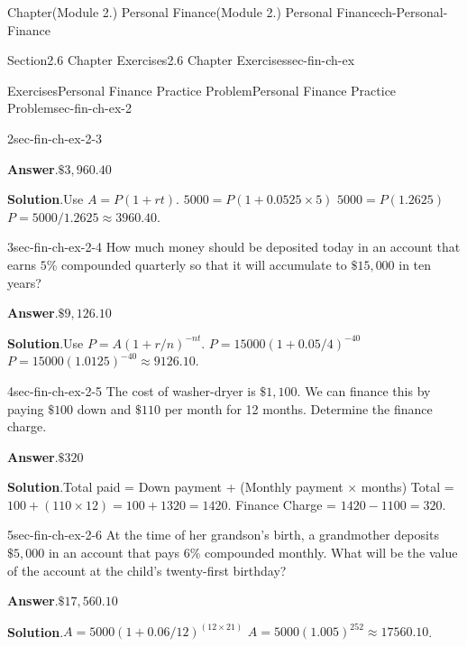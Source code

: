 \documentclass[oneside,10pt,]{book}
\newcommand{\blocktitlefont}{\relax}
\begin{document}
\begin{chapterptx}{Chapter}{(Module 2.) Personal Finance}{}{(Module 2.) Personal Finance}{}{}{ch-Personal-Finance}
\begin{sectionptx}{Section}{2.6 Chapter Exercises}{}{2.6 Chapter Exercises}{}{}{sec-fin-ch-ex}
\begin{exercises-subsection-numberless}{Exercises}{Personal Finance Practice Problem}{}{Personal Finance Practice Problem}{}{}{sec-fin-ch-ex-2}
\begin{divisionexercise}{2}{}{}{sec-fin-ch-ex-2-3}
\par\smallskip%
\noindent\textbf{\blocktitlefont Answer}.\hypertarget{sec-fin-ch-ex-2-3-2}{}\quad{}\(\$3,960.40\)%
\par\smallskip%
\noindent\textbf{\blocktitlefont Solution}.\hypertarget{sec-fin-ch-ex-2-3-3}{}\quad{}Use \(A = P(1 + rt)\). \(5000 = P(1 + 0.0525 \times 5)\) \(5000 = P(1.2625)\) \(P = 5000 / 1.2625 \approx 3960.40\).%
\end{divisionexercise}%
\begin{divisionexercise}{3}{}{}{sec-fin-ch-ex-2-4}%
How much money should be deposited today in an account that earns \(5\%\) compounded quarterly so that it will accumulate to \(\$15,000\) in ten years?%
\par\smallskip%
\noindent\textbf{\blocktitlefont Answer}.\hypertarget{sec-fin-ch-ex-2-4-2}{}\quad{}\(\$9,126.10\)%
\par\smallskip%
\noindent\textbf{\blocktitlefont Solution}.\hypertarget{sec-fin-ch-ex-2-4-3}{}\quad{}Use \(P = A(1 + r/n)^{-nt}\). \(P = 15000(1 + 0.05/4)^{-40}\) \(P = 15000(1.0125)^{-40} \approx 9126.10\).%
\end{divisionexercise}%
\begin{divisionexercise}{4}{}{}{sec-fin-ch-ex-2-5}%
The cost of washer-dryer is \(\$1,100\). We can finance this by paying \(\$100\) down and \(\$110\) per month for 12 months. Determine the finance charge.%
\par\smallskip%
\noindent\textbf{\blocktitlefont Answer}.\hypertarget{sec-fin-ch-ex-2-5-2}{}\quad{}\(\$320\)%
\par\smallskip%
\noindent\textbf{\blocktitlefont Solution}.\hypertarget{sec-fin-ch-ex-2-5-3}{}\quad{}Total paid = Down payment + (Monthly payment \(\times\) months) Total = \(100 + (110 \times 12) = 100 + 1320 = 1420\). Finance Charge = \(1420 - 1100 = 320\).%
\end{divisionexercise}%
\begin{divisionexercise}{5}{}{}{sec-fin-ch-ex-2-6}%
At the time of her grandson's birth, a grandmother deposits \(\$5,000\) in an account that pays \(6\%\) compounded monthly. What will be the value of the account at the child's twenty-first birthday?%
\par\smallskip%
\noindent\textbf{\blocktitlefont Answer}.\hypertarget{sec-fin-ch-ex-2-6-2}{}\quad{}\(\$17,560.10\)%
\par\smallskip%
\noindent\textbf{\blocktitlefont Solution}.\hypertarget{sec-fin-ch-ex-2-6-3}{}\quad{}\(A = 5000(1 + 0.06/12)^{(12 \times 21)}\) \(A = 5000(1.005)^{252} \approx 17560.10\).%

\end{divisionexercise}
\end{exercises-subsection-numberless}
\end{sectionptx}
\end{chapterptx}
\end{document}
